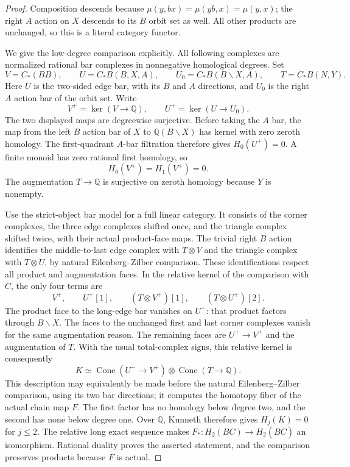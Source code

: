 \begin{proof}
Composition descends because
$\mu(y,bx)=\mu(yb,x)=\mu(y,x)$; the right $A$ action
on $X$ descends to its $B$ orbit set as well.  All other
products are unchanged, so this is a literal category functor.

We give the low-degree comparison explicitly.  All following
complexes are normalized rational bar complexes in nonnegative
homological degrees.  Set
\[
 V=C_*(BB),\qquad
 U=C_*B(B,X,A),\qquad
 U_0=C_*B(B\backslash X,A),\qquad
 T=C_*B(N,Y).
\]
Here $U$ is the two-sided edge bar, with its $B$ and $A$
directions, and $U_0$ is the right $A$ action bar of the
orbit set.  Write
\[
 V^+=\ker(V\longrightarrow\mathbb Q),\qquad
 U^+=\ker(U\longrightarrow U_0).
\]
The two displayed maps are degreewise surjective.  Before
taking the $A$ bar, the map from the left $B$ action bar
of $X$ to $\mathbb Q(B\backslash X)$ has kernel with zero
zeroth homology.  The first-quadrant $A$-bar filtration
therefore gives $H_0(U^+)=0$.  A finite monoid has zero
rational first homology, so
\[
 H_0(V^+)=H_1(V^+)=0.
\]
The augmentation $T\to\mathbb Q$ is surjective on
zeroth homology because $Y$ is nonempty.

Use the strict-object bar model for a full linear category.
It consists of the corner complexes, the three edge complexes
shifted once, and the triangle complex shifted twice, with
their actual product-face maps.  The trivial right $B$ action
identifies the middle-to-last edge complex with $T\otimes V$
and the triangle complex with $T\otimes U$, by natural
Eilenberg--Zilber comparison.  These identifications respect
all product and augmentation faces.  In the relative kernel
of the comparison with $\overline C$, the only four terms are
\[
 V^+,\qquad U^+[1],\qquad
 (T\otimes V^+)[1],\qquad (T\otimes U^+)[2].
\]
The product face to the long-edge bar vanishes on $U^+$:
that product factors through $B\backslash X$.  The faces to
the unchanged first and last corner complexes vanish for
the same augmentation reason.  The remaining faces are
$U^+\to V^+$ and the augmentation of $T$.  With the usual
total-complex signs, this relative kernel is consequently
\[
 K\simeq
 \operatorname{Cone}(U^+\longrightarrow V^+)
 \otimes
 \operatorname{Cone}(T\longrightarrow\mathbb Q).
\]
This description may equivalently be made before the natural
Eilenberg--Zilber comparison, using its two bar directions;
it computes the homotopy fiber of the actual chain map $F$.
The first factor has no homology below degree two, and the
second has none below degree one.  Over $\mathbb Q$, Kunneth
therefore gives $H_j(K)=0$ for $j\leq2$.  The relative long
exact sequence makes $F_*:H_2(BC)\to H_2(B\overline C)$ an
isomorphism.  Rational duality proves the asserted statement,
and the comparison preserves products because $F$ is actual.
\end{proof}

